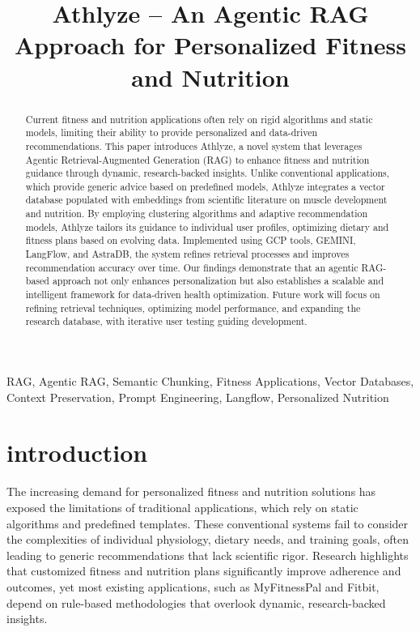 \documentclass[conference]{IEEEtran}
\title{Athlyze – An Agentic RAG Approach for Personalized Fitness and Nutrition}
\author{
    \IEEEauthorblockN{Nishchay Patel}
    \IEEEauthorblockA{
        Department of Computer Science, \\ 
        Georgia State University,\\
        Atlanta, GA, USA\\
        \href{mailto:npatel237@student.gsu.edu}{npatel237@student.gsu.edu}
    }
}
\begin{document}
\maketitle

\begin{abstract}
Current fitness and nutrition applications often rely on rigid algorithms and static models, limiting their ability to provide personalized and data-driven recommendations. This paper introduces Athlyze, a novel system that leverages Agentic Retrieval-Augmented Generation (RAG) to enhance fitness and nutrition guidance through dynamic, research-backed insights. Unlike conventional applications, which provide generic advice based on predefined models, Athlyze integrates a vector database populated with embeddings from scientific literature on muscle development and nutrition. By employing clustering algorithms and adaptive recommendation models, Athlyze tailors its guidance to individual user profiles, optimizing dietary and fitness plans based on evolving data. Implemented using GCP tools, GEMINI, LangFlow, and AstraDB, the system refines retrieval processes and improves recommendation accuracy over time. Our findings demonstrate that an agentic RAG-based approach not only enhances personalization but also establishes a scalable and intelligent framework for data-driven health optimization. Future work will focus on refining retrieval techniques, optimizing model performance, and expanding the research database, with iterative user testing guiding development.\\
\end{abstract}

\renewcommand\IEEEkeywordsname{Keywords}
\begin{IEEEkeywords}
RAG, Agentic RAG, Semantic Chunking, Fitness Applications, Vector Databases, Context Preservation, Prompt Engineering, Langflow, Personalized Nutrition
\end{IEEEkeywords}

\section{introduction}
The increasing demand for personalized fitness and nutrition solutions has exposed the limitations of traditional applications, which rely on static algorithms and predefined templates. These conventional systems fail to consider the complexities of individual physiology, dietary needs, and training goals, often leading to generic recommendations that lack scientific rigor\cite{9}. Research highlights that customized fitness and nutrition plans significantly improve adherence and outcomes, yet most existing applications, such as MyFitnessPal and Fitbit, depend on rule-based methodologies that overlook dynamic, research-backed insights.
\end{document}
